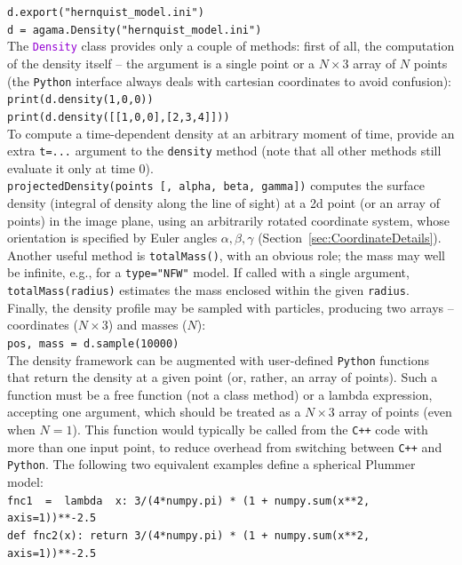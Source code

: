 \documentclass[12pt]{article}
\newcommand{\Cpp}  {\texttt{C++}\xspace}
\newcommand{\Python}{\texttt{Python}\xspace}
\newcommand{\ttt}[1]{\textcolor{darkviolet}{\texttt{#1}}}
\newcommand{\ppp}[1]{\textcolor{darkolive} {\texttt{#1}}}
\begin{document}
\texttt{d.export("hernquist_model.ini")}\\
\texttt{d = agama.Density("hernquist_model.ini")}\\[2mm]
The \ttt{Density} class provides only a couple of methods: first of all, the computation of the density itself -- the argument is a single point or a $N\times3$ array of $N$ points (the \Python interface always deals with cartesian coordinates to avoid confusion):\\
\texttt{print(d.density(1,0,0))}\\
\texttt{print(d.density([[1,0,0],[2,3,4]]))}\\
To compute a time-dependent density at an arbitrary moment of time, provide an extra \texttt{t=...} argument to the \texttt{density} method (note that all other methods still evaluate it only at time 0).\\[2mm]
\texttt{projectedDensity(points [, alpha, beta, gamma])} computes the surface density (integral of density along the line of sight) at a 2d point (or an array of points) in the image plane, using an arbitrarily rotated coordinate system, whose orientation is specified by Euler angles $\alpha, \beta, \gamma$ (Section~\ref{sec:CoordinateDetails}).\\[2mm]
Another useful method is \texttt{totalMass()}, with an obvious role; the mass may well be infinite, e.g., for a \ppp{type="NFW"} model. If called with a single argument, \texttt{totalMass(radius)} estimates the mass enclosed within the given \texttt{radius}.\\[2mm]
Finally, the density profile may be sampled with particles, producing two arrays -- coordinates ($N\times3$) and masses ($N$): \\
\texttt{pos, mass = d.sample(10000)}\\[2mm]
The density framework can be augmented with user-defined \Python functions that return the density at a given point (or, rather, an array of points). Such a function must be a free function (not a class method) or a lambda expression, accepting one argument, which should be treated as a $N\times3$ array of points (even when $N=1$). This function would typically be called from the \Cpp code with more than one input point, to reduce overhead from switching between \Cpp and \Python. The following two equivalent examples define a spherical Plummer model:\\
\texttt{fnc1~~=~~lambda~~x:  3/(4*numpy.pi) * (1 + numpy.sum(x**2, axis=1))**-2.5}\\
\texttt{def fnc2(x):  return 3/(4*numpy.pi) * (1 + numpy.sum(x**2, axis=1))**-2.5}\\[2mm]
\end{document}
